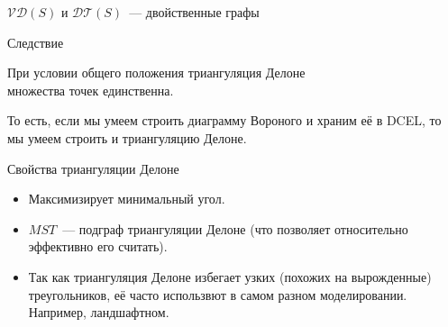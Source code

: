     \begin{frame}{$\mathcal{V}\mathcal{D}(S)$ и $\mathcal{D}\mathcal{T}(S)$~--- двойственные графы}

        \begin{block}{Следствие}

                При условии общего положения триангуляция Делоне \\ множества точек единственна.

        \end{block}

        То есть, если мы умеем строить диаграмму Вороного и храним её в DCEL, то мы умеем строить и триангуляцию
        Делоне.

    \end{frame}

    \begin{frame}{Свойства триангуляции Делоне}

        \begin{itemize}

            \item Максимизирует минимальный угол.

            \item $MST$~--- подграф триангуляции Делоне (что позволяет относительно эффективно его считать).

            \item Так как триангуляция Делоне избегает узких (похожих на вырожденные) треугольников, её часто использвют
                  в самом разном моделировании. Например, ландшафтном.

        \end{itemize}

    \end{frame}
